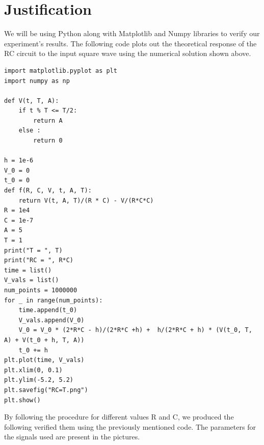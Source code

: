 \documentclass[a4paper,12pt]{article}
\begin{document}
\section{Justification}
We will be using Python along with Matplotlib and Numpy libraries to verify our experiment's results. The following code plots out the theoretical response of the RC circuit to the input square wave using the numerical solution shown above.
\begin{verbatim}
import matplotlib.pyplot as plt 
import numpy as np 

def V(t, T, A):
    if t % T <= T/2:
        return A 
    else :
        return 0

h = 1e-6
V_0 = 0
t_0 = 0
def f(R, C, V, t, A, T):
    return V(t, A, T)/(R * C) - V/(R*C*C)
R = 1e4
C = 1e-7
A = 5
T = 1
print("T = ", T)
print("RC = ", R*C)
time = list()
V_vals = list()
num_points = 1000000
for _ in range(num_points):
    time.append(t_0)
    V_vals.append(V_0)
    V_0 = V_0 * (2*R*C - h)/(2*R*C +h) +  h/(2*R*C + h) * (V(t_0, T, A) + V(t_0 + h, T, A))
    t_0 += h
plt.plot(time, V_vals)
plt.xlim(0, 0.1)
plt.ylim(-5.2, 5.2)
plt.savefig("RC=T.png")
plt.show()
\end{verbatim}
By following the procedure for different values R and C, we produced the following  verified them using the previously mentioned code.
The parameters for the signals used are present in the pictures.
\end{document}
